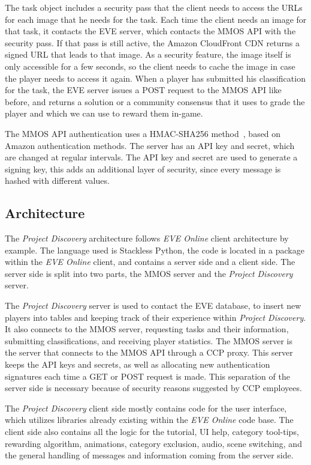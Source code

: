 The task object includes a security pass that the client needs to access the URLs for each image that he needs for the task. Each time the client needs an image for that task, it contacts the EVE server, which contacts the MMOS API with the security pass. If that pass is still active, the Amazon CloudFront CDN returns a signed URL that leads to that image. As a security feature, the image itself is only accessible for a few seconds, so the client needs to cache the image in case the player needs to access it again. When a player has submitted his classification for the task, the EVE server issues a POST request to the MMOS API like before, and returns a solution or a community consensus that it uses to grade the player and which we can use to reward them in-game.

The MMOS API authentication uses a HMAC-SHA256 method~\cite{hmac}, based on Amazon authentication methods. The server has an API key and secret, which are changed at regular intervals. The API key and secret are used to generate a signing key, this adds an additional layer of security, since every message is hashed with different values.

\subsection{Architecture}
The \emph{Project Discovery} architecture follows \emph{EVE Online} client architecture by example. The language used is Stackless Python, the code is located in a package within the \emph{EVE Online} client, and contains a server side and a client side. The server side is split into two parts, the MMOS server and the \emph{Project Discovery} server. 

The \emph{Project Discovery} server is used to contact the EVE database, to insert new players into tables and keeping track of their experience within \emph{Project Discovery}. It also connects to the MMOS server, requesting tasks and their information, submitting classifications, and receiving player statistics. The MMOS server is the server that connects to the MMOS API through a CCP proxy. This server keeps the API keys and secrets, as well as allocating new authentication signatures each time a GET or POST request is made. This separation of the server side is necessary because of security reasons suggested by CCP employees.

The \emph{Project Discovery} client side mostly contains code for the user interface, which utilizes libraries already existing within the \emph{EVE Online} code base. The client side also contains all the logic for the tutorial, UI help, category tool-tips, rewarding algorithm, animations, category exclusion, audio, scene switching, and the general handling of messages and information coming from the server side.

